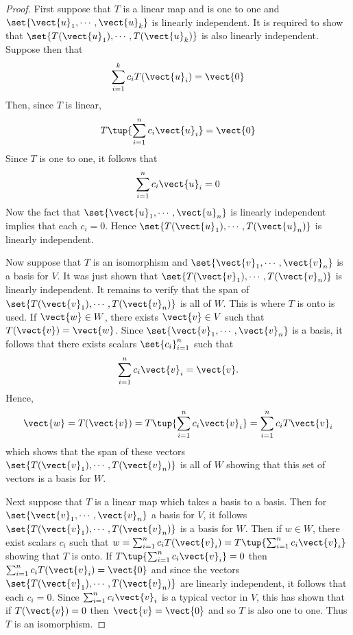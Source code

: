 \begin{proof}
First suppose that $T$ is a linear map and is one to one
and $\set{\vect{u}_{1},\cdots ,\vect{u}_{k}} $ is linearly
independent. It is required to show that $\set{T(\vect{u}_{1}),\cdots ,T(\vect{u}_{k})} $ is also linearly independent. Suppose then that 
\begin{equation*}
\sum_{i=1}^{k}c_{i}T(\vect{u}_{i})=\vect{0}
\end{equation*}
Then, since $T$ is linear, 
\begin{equation*}
T\tup{\sum_{i=1}^{n}c_{i}\vect{u}_{i}} =\vect{0}
\end{equation*}
Since $T$ is one to one, it follows that 
\begin{equation*}
\sum_{i=1}^{n}c_{i}\vect{u}_{i}=0
\end{equation*}
Now the fact that $\set{\vect{u}_{1},\cdots ,\vect{u}_{n}} $ is
linearly independent implies that each $c_{i}=0$. Hence $\set{T(\vect{u}
_{1}),\cdots ,T(\vect{u}_{n})} $ is linearly independent.

Now suppose that $T$ is an isomorphism and $\set{\vect{v}_{1},\cdots ,\vect{
v}_{n}} $ is a basis for $V$. It was just shown that $\set{T(\vect{v}
_{1}),\cdots ,T(\vect{v}_{n})} $ is linearly independent. It remains to
verify that the span of $\set{T(\vect{v}_{1}),\cdots ,T(\vect{v}_{n})} $
is all of $W$. This is where $T$ is onto is used. If $\vect{w}\in W$, there
exists $\vect{v}\in V$ such that $T(\vect{v})=\vect{w}$. Since $\set{\vect{v}
_{1},\cdots ,\vect{v}_{n}} $ is a basis, it follows that there exists
scalars $\set{c_{i}} _{i=1}^{n}$ such that 
\begin{equation*}
\sum_{i=1}^{n}c_{i}\vect{v}_{i}=\vect{v}.
\end{equation*}
Hence, 
\begin{equation*}
\vect{w}=T(\vect{v})=T\tup{\sum_{i=1}^{n}c_{i}\vect{v}_{i}}
=\sum_{i=1}^{n}c_{i}T\vect{v}_{i}
\end{equation*}
which shows that the span of these vectors $\set{T(\vect{v}_{1}),\cdots ,T
(\vect{v}_{n})} $ is all of $W$ showing that this set of vectors is a
basis for $W$.

Next suppose that $T$ is a linear map which takes a basis to a basis. Then
for $\set{\vect{v}_{1},\cdots ,\vect{v}_{n}} $ a basis for $V$, it
follows $\set{T(\vect{v}_{1}),\cdots ,T(\vect{v}_{n})} $ is a basis for $
W$. Then if $w\in W$, there exist scalars $c_{i}$ such that $
w=\sum_{i=1}^{n}c_{i}T(\vect{v}_{i})=T\tup{\sum_{i=1}^{n}c_{i}\vect{v}_{i}} $
showing that $T$ is onto. If $T\tup{\sum_{i=1}^{n}c_{i}\vect{v}_{i}} =0$
then $\sum_{i=1}^{n}c_{i}T(\vect{v}_{i})=\vect{0}$ and since the vectors $\set{T(\vect{v}
_{1}),\cdots ,T(\vect{v}_{n})} $ are linearly independent, it follows
that each $c_{i}=0$. Since $\sum_{i=1}^{n}c_{i}\vect{v}_{i}$ is a typical vector in 
$V$, this has shown that if $T(\vect{v})=0$ then $\vect{v}=\vect{0}$ and so $T$ is also one to one.
Thus $T$ is an isomorphism.
\end{proof}

